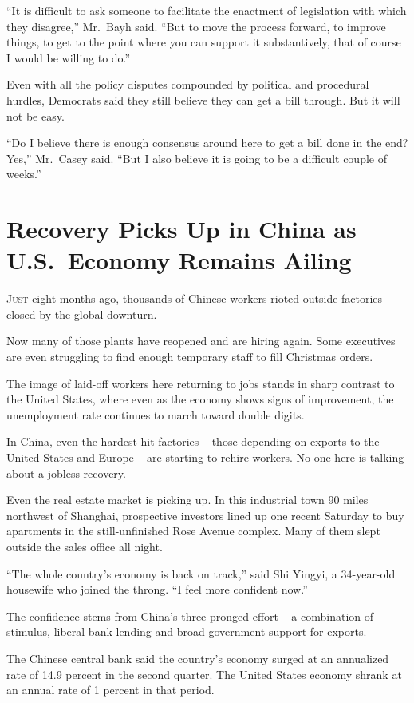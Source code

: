 ﻿\documentclass[12pt]{article}
\begin{document}
``It is difficult to ask someone to facilitate the enactment of legislation with which they
disagree,'' Mr.~Bayh said. ``But to move the process forward, to improve things, to get to the point
where you can support it substantively, that of course I would be willing to do.''

Even with all the policy disputes compounded by political and procedural hurdles, Democrats said
they still believe they can get a bill through. But it will not be easy.

``Do I believe there is enough consensus around here to get a bill done in the end? Yes,'' Mr.~Casey
said. ``But I also believe it is going to be a difficult couple of weeks.''

\section{Recovery Picks Up in China as U.S.~Economy Remains Ailing}

\lettrine{J}{ust} eight months ago, thousands of Chinese workers rioted outside factories closed by
the global downturn.

Now many of those plants have reopened and are hiring again. Some executives are even struggling to
find enough temporary staff to fill Christmas orders.

The image of laid-off workers here returning to jobs stands in sharp contrast to the United States,
where even as the economy shows signs of improvement, the unemployment rate continues to march
toward double digits.

In China, even the hardest-hit factories -- those depending on exports to the United States and
Europe -- are starting to rehire workers. No one here is talking about a jobless recovery.

Even the real estate market is picking up. In this industrial town 90 miles northwest of Shanghai,
prospective investors lined up one recent Saturday to buy apartments in the still-unfinished Rose
Avenue complex. Many of them slept outside the sales office all night.

``The whole country's economy is back on track,'' said Shi Yingyi, a 34-year-old housewife who
joined the throng\cite{throng}. ``I feel more confident now.''

The confidence stems from China's three-pronged effort -- a combination of stimulus, liberal bank
lending and broad government support for exports.

The Chinese central bank said the country's economy surged\cite{surge} at an annualized rate of 14.9
percent in the second quarter. The United States economy shrank at an annual rate of 1 percent in
that period.
\end{document}
